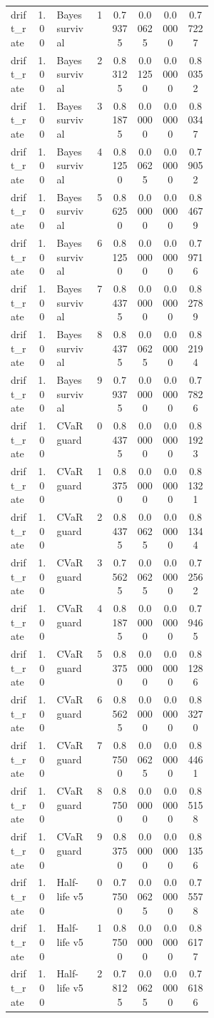 \documentclass{article}
\begin{document}
\begin{center}
\begin{longtable}{p{0.13\linewidth}cp{0.20\linewidth}ccccc}
drift\_rate & 1.00 & Bayes survival & 1 & 0.79375 & 0.00625 & 0.00000 & 0.77227\\
drift\_rate & 1.00 & Bayes survival & 2 & 0.83125 & 0.01250 & 0.00000 & 0.80352\\
drift\_rate & 1.00 & Bayes survival & 3 & 0.81875 & 0.00000 & 0.00000 & 0.80347\\
drift\_rate & 1.00 & Bayes survival & 4 & 0.81250 & 0.00625 & 0.00000 & 0.79052\\
drift\_rate & 1.00 & Bayes survival & 5 & 0.86250 & 0.00000 & 0.00000 & 0.84679\\
drift\_rate & 1.00 & Bayes survival & 6 & 0.81250 & 0.00000 & 0.00000 & 0.79716\\
drift\_rate & 1.00 & Bayes survival & 7 & 0.84375 & 0.00000 & 0.00000 & 0.82789\\
drift\_rate & 1.00 & Bayes survival & 8 & 0.84375 & 0.00625 & 0.00000 & 0.82194\\
drift\_rate & 1.00 & Bayes survival & 9 & 0.79375 & 0.00000 & 0.00000 & 0.77826\\
drift\_rate & 1.00 & CVaR guard & 0 & 0.84375 & 0.00000 & 0.00000 & 0.81923\\
drift\_rate & 1.00 & CVaR guard & 1 & 0.83750 & 0.00000 & 0.00000 & 0.81321\\
drift\_rate & 1.00 & CVaR guard & 2 & 0.84375 & 0.00625 & 0.00000 & 0.81344\\
drift\_rate & 1.00 & CVaR guard & 3 & 0.75625 & 0.00625 & 0.00000 & 0.72562\\
drift\_rate & 1.00 & CVaR guard & 4 & 0.81875 & 0.00000 & 0.00000 & 0.79465\\
drift\_rate & 1.00 & CVaR guard & 5 & 0.83750 & 0.00000 & 0.00000 & 0.81286\\
drift\_rate & 1.00 & CVaR guard & 6 & 0.85625 & 0.00000 & 0.00000 & 0.83270\\
drift\_rate & 1.00 & CVaR guard & 7 & 0.87500 & 0.00625 & 0.00000 & 0.84461\\
drift\_rate & 1.00 & CVaR guard & 8 & 0.87500 & 0.00000 & 0.00000 & 0.85158\\
drift\_rate & 1.00 & CVaR guard & 9 & 0.83750 & 0.00000 & 0.00000 & 0.81356\\
drift\_rate & 1.00 & Half-life v5 & 0 & 0.77500 & 0.00625 & 0.00000 & 0.75578\\
drift\_rate & 1.00 & Half-life v5 & 1 & 0.87500 & 0.00000 & 0.00000 & 0.86177\\
drift\_rate & 1.00 & Half-life v5 & 2 & 0.78125 & 0.00625 & 0.00000 & 0.76186\\

\end{longtable}
\end{center}
\end{document}
